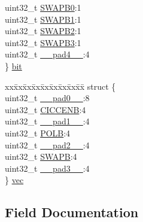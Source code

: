 \begin{DoxyCompactItemize}
\begin{tabbing}
\>uint32\_t \mbox{\hyperlink{union_t_c_c___w_a_v_e_b___type_ae78c558d315c8a3fc21e47221edd1c03}{SWAPB0}}:1\\
\>uint32\_t \mbox{\hyperlink{union_t_c_c___w_a_v_e_b___type_ae8e5257a4b895c94a4d82202c17b83b8}{SWAPB1}}:1\\
\>uint32\_t \mbox{\hyperlink{union_t_c_c___w_a_v_e_b___type_ae5215071fa7f92356e12e57ba8457e30}{SWAPB2}}:1\\
\>uint32\_t \mbox{\hyperlink{union_t_c_c___w_a_v_e_b___type_a28860e3bd9f8836ee966aa1450413ffe}{SWAPB3}}:1\\
\>uint32\_t \mbox{\hyperlink{union_t_c_c___w_a_v_e_b___type_a7b2edc85d90e34c4435951e1e5c59517}{\_\_pad4\_\_}}:4\\
\} \mbox{\hyperlink{union_t_c_c___w_a_v_e_b___type_a395211bd95a48ebcfe37cd133413e5fb}{bit}}\\

\end{tabbing}\item 
\begin{tabbing}
xx\=xx\=xx\=xx\=xx\=xx\=xx\=xx\=xx\=\kill
struct \{\\
\>uint32\_t \mbox{\hyperlink{union_t_c_c___w_a_v_e_b___type_a3e57c2ef1c3ffb36722f000cc1156824}{\_\_pad0\_\_}}:8\\
\>uint32\_t \mbox{\hyperlink{union_t_c_c___w_a_v_e_b___type_af9b746d11166f3f0f15ccb1ce5f440fe}{CICCENB}}:4\\
\>uint32\_t \mbox{\hyperlink{union_t_c_c___w_a_v_e_b___type_a6712ba6dd1d5b43d2d56ff8ac4e275a7}{\_\_pad1\_\_}}:4\\
\>uint32\_t \mbox{\hyperlink{union_t_c_c___w_a_v_e_b___type_a508b6c407aad2d172dedd6b96c7022da}{POLB}}:4\\
\>uint32\_t \mbox{\hyperlink{union_t_c_c___w_a_v_e_b___type_a9ce12a63de64ef64ae2d59d128251cae}{\_\_pad2\_\_}}:4\\
\>uint32\_t \mbox{\hyperlink{union_t_c_c___w_a_v_e_b___type_ae01da6287345ce2eb0f3e18e913893e0}{SWAPB}}:4\\
\>uint32\_t \mbox{\hyperlink{union_t_c_c___w_a_v_e_b___type_a4854608c0e776f0704a4d9a4b98ea57d}{\_\_pad3\_\_}}:4\\
\} \mbox{\hyperlink{union_t_c_c___w_a_v_e_b___type_a37fffb0a6c344ef51ac06d09e770715b}{vec}}\\

\end{tabbing}\end{DoxyCompactItemize}


\subsection{Field Documentation}
\mbox{\label{union_t_c_c___w_a_v_e_b___type_a3e57c2ef1c3ffb36722f000cc1156824}} 
